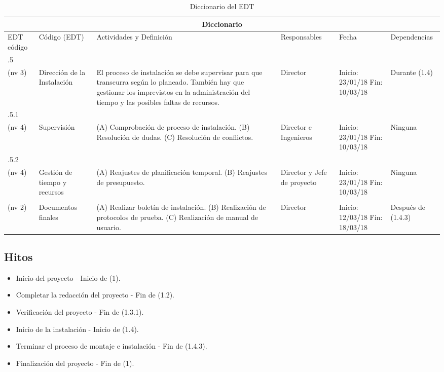 \begin{table}[H]
\begin{tabular}{|m{1cm}|m{2cm}|m{5cm}|m{2cm}|m{2.5cm}|m{2.8cm}| }
\hline
 \multicolumn{6}{|c|}{\centering Diccionario} \\
\hline
\rowcolor{gray!50} \centering EDT código & \centering Código (EDT) & Actividades y Definición & Responsables & Fecha & Dependencias \\
\hline
 \centering 1.4.5\\ (nv 3) & \centering Dirección de la Instalación & El proceso de instalación se debe supervisar para que transcurra según lo planeado. También hay que gestionar los imprevistos en la administración del tiempo y las posibles faltas de recursos.& \centering Director & Inicio: 23/01/18 Fin: 10/03/18 & Durante (1.4) \\
\hline
 \centering 1.4.5.1\\ (nv 4) & \centering Supervisión & 
(A) Comprobación de proceso de instalación. (B) Resolución de dudas. (C) Resolución de conflictos. & \centering Director e Ingenieros& Inicio: 23/01/18 Fin: 10/03/18 & Ninguna \\
 \hline
 \centering 1.4.5.2\\ (nv 4) & \centering Gestión de tiempo y recursos & (A) Reajustes de planificación temporal. (B) Reajustes de presupuesto. & \centering Director y Jefe de proyecto & Inicio: 23/01/18 Fin: 10/03/18 & Ninguna \\
\hline
 \centering 1.5\\ (nv 2) & \centering Documentos finales & (A) Realizar boletín de instalación.
(B) Realización de protocolos de prueba.
(C) Realización de manual de usuario. & \centering Director & Inicio: 12/03/18 Fin: 18/03/18 & Después de (1.4.3) \\
\hline
\end{tabular}
\caption{Diccionario del EDT}
\label{table:ta1}
\end{table}

\subsection{Hitos}

\begin{itemize}

\item Inicio del proyecto - Inicio de (1).
\item Completar la redacción del proyecto - Fin de (1.2).
\item Verificación del proyecto - Fin de (1.3.1).
\item Inicio de la instalación - Inicio de (1.4).
\item Terminar el proceso de montaje e instalación - Fin de (1.4.3).
\item Finalización del proyecto - Fin de (1).

\end{itemize}
\newpage

